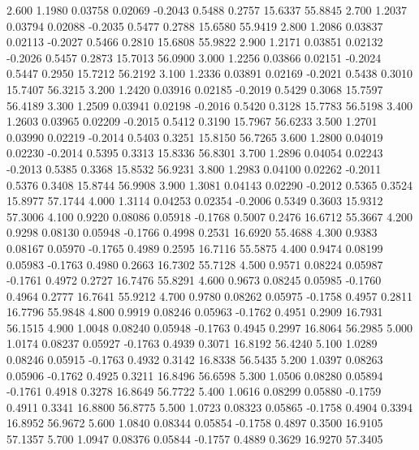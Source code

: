    2.600   1.1980   0.03758   0.02069  -0.2043   0.5488   0.2757  15.6337  55.8845
   2.700   1.2037   0.03794   0.02088  -0.2035   0.5477   0.2788  15.6580  55.9419
   2.800   1.2086   0.03837   0.02113  -0.2027   0.5466   0.2810  15.6808  55.9822
   2.900   1.2171   0.03851   0.02132  -0.2026   0.5457   0.2873  15.7013  56.0900
   3.000   1.2256   0.03866   0.02151  -0.2024   0.5447   0.2950  15.7212  56.2192
   3.100   1.2336   0.03891   0.02169  -0.2021   0.5438   0.3010  15.7407  56.3215
   3.200   1.2420   0.03916   0.02185  -0.2019   0.5429   0.3068  15.7597  56.4189
   3.300   1.2509   0.03941   0.02198  -0.2016   0.5420   0.3128  15.7783  56.5198
   3.400   1.2603   0.03965   0.02209  -0.2015   0.5412   0.3190  15.7967  56.6233
   3.500   1.2701   0.03990   0.02219  -0.2014   0.5403   0.3251  15.8150  56.7265
   3.600   1.2800   0.04019   0.02230  -0.2014   0.5395   0.3313  15.8336  56.8301
   3.700   1.2896   0.04054   0.02243  -0.2013   0.5385   0.3368  15.8532  56.9231
   3.800   1.2983   0.04100   0.02262  -0.2011   0.5376   0.3408  15.8744  56.9908
   3.900   1.3081   0.04143   0.02290  -0.2012   0.5365   0.3524  15.8977  57.1744
   4.000   1.3114   0.04253   0.02354  -0.2006   0.5349   0.3603  15.9312  57.3006
   4.100   0.9220   0.08086   0.05918  -0.1768   0.5007   0.2476  16.6712  55.3667
   4.200   0.9298   0.08130   0.05948  -0.1766   0.4998   0.2531  16.6920  55.4688
   4.300   0.9383   0.08167   0.05970  -0.1765   0.4989   0.2595  16.7116  55.5875
   4.400   0.9474   0.08199   0.05983  -0.1763   0.4980   0.2663  16.7302  55.7128
   4.500   0.9571   0.08224   0.05987  -0.1761   0.4972   0.2727  16.7476  55.8291
   4.600   0.9673   0.08245   0.05985  -0.1760   0.4964   0.2777  16.7641  55.9212
   4.700   0.9780   0.08262   0.05975  -0.1758   0.4957   0.2811  16.7796  55.9848
   4.800   0.9919   0.08246   0.05963  -0.1762   0.4951   0.2909  16.7931  56.1515
   4.900   1.0048   0.08240   0.05948  -0.1763   0.4945   0.2997  16.8064  56.2985
   5.000   1.0174   0.08237   0.05927  -0.1763   0.4939   0.3071  16.8192  56.4240
   5.100   1.0289   0.08246   0.05915  -0.1763   0.4932   0.3142  16.8338  56.5435
   5.200   1.0397   0.08263   0.05906  -0.1762   0.4925   0.3211  16.8496  56.6598
   5.300   1.0506   0.08280   0.05894  -0.1761   0.4918   0.3278  16.8649  56.7722
   5.400   1.0616   0.08299   0.05880  -0.1759   0.4911   0.3341  16.8800  56.8775
   5.500   1.0723   0.08323   0.05865  -0.1758   0.4904   0.3394  16.8952  56.9672
   5.600   1.0840   0.08344   0.05854  -0.1758   0.4897   0.3500  16.9105  57.1357
   5.700   1.0947   0.08376   0.05844  -0.1757   0.4889   0.3629  16.9270  57.3405
